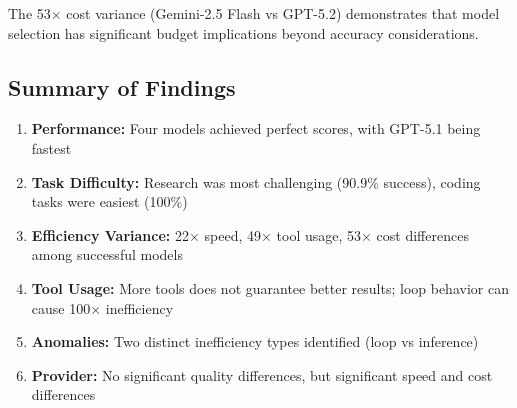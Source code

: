 The 53$\times$ cost variance (Gemini-2.5 Flash vs GPT-5.2) demonstrates that model selection has significant budget implications beyond accuracy considerations.

\subsection{Summary of Findings}
\label{sec:summary}

\begin{enumerate}
    \item \textbf{Performance:} Four models achieved perfect scores, with GPT-5.1 being fastest
    \item \textbf{Task Difficulty:} Research was most challenging (90.9\% success), coding tasks were easiest (100\%)
    \item \textbf{Efficiency Variance:} 22$\times$ speed, 49$\times$ tool usage, 53$\times$ cost differences among successful models
    \item \textbf{Tool Usage:} More tools does not guarantee better results; loop behavior can cause 100$\times$ inefficiency
    \item \textbf{Anomalies:} Two distinct inefficiency types identified (loop vs inference)
    \item \textbf{Provider:} No significant quality differences, but significant speed and cost differences
\end{enumerate}
